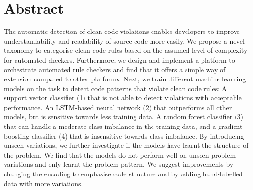 \section*{Abstract}    
The automatic detection of clean code violations enables developers to improve understandability and readability of source code more easily. We propose a novel taxonomy to categorise clean code rules based on the assumed level of complexity for automated checkers. Furthermore, we design and implement a platform to orchestrate automated rule checkers and find that it offers a simple way of extension compared to other platforms. Next, we train different machine learning models on the task to detect code patterns that violate clean code rules: A support vector classifier (1) that is not able to detect violations with acceptable performance. An LSTM-based neural network (2) that outperforms all other models, but is sensitive towards less training data. A random forest classifier (3) that can handle a moderate class imbalance in the training data, and a gradient boosting classifier (4) that is insensitive towards class imbalance. By introducing unseen variations, we further investigate if the models have learnt the structure of the problem. We find that the models do not perform well on unseen problem variations and only learnt the problem pattern. We suggest improvements by changing the encoding to emphasise code structure and by adding hand-labelled data with more variations.